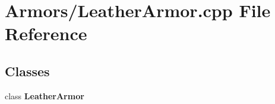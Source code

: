\section{Armors/\-Leather\-Armor.cpp File Reference}
\label{_leather_armor_8cpp}
\subsection*{Classes}
\begin{DoxyCompactItemize}
\item 
class {\bf Leather\-Armor}
\end{DoxyCompactItemize}
